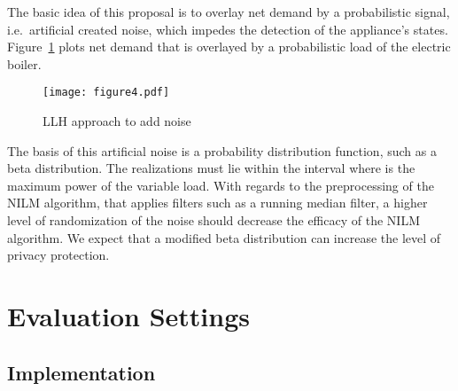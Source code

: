\documentclass{article}
\begin{document}
The basic idea of this proposal is to overlay net demand by a probabilistic signal, i.e.\ artificial created noise, which impedes the detection of the appliance’s states. Figure~\ref{llh_method} plots net demand that is overlayed by a probabilistic load of the electric boiler.
\begin{figure}[h!]
	\centering
	\texttt{[image: figure4.pdf]}
	\caption{\ac{LLH} approach to add noise}
	\label{llh_method}
\end{figure}
The basis of this artificial noise is a probability distribution function, such as a beta distribution. The realizations must lie within the interval  where  is the maximum power of the variable load. 
With regards to the preprocessing of the \ac{NILM} algorithm, that applies filters such as a running median filter, a higher level of randomization of the noise should decrease the efficacy of the \ac{NILM} algorithm. We expect that a modified beta distribution can increase the level of privacy protection. 

\section{Evaluation Settings}\label{sec:settings}
\subsection{Implementation}
\end{document}
